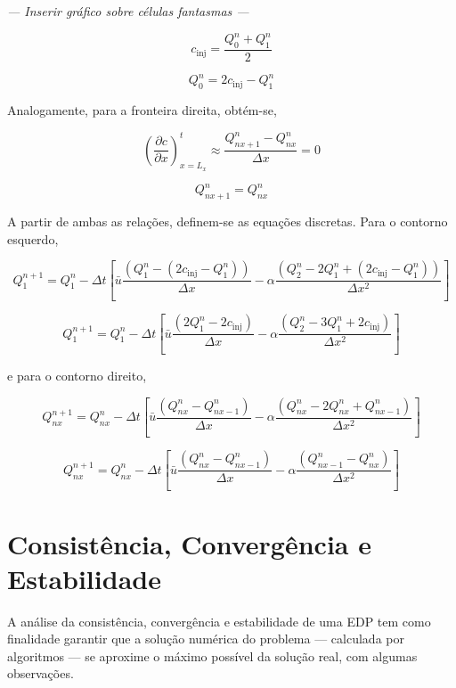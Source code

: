 \begin{center}
    \textit{--- Inserir gráfico sobre células fantasmas ---}
\end{center}

\[
    c_{\text{inj}} = \frac{Q_0^n + Q_1^n}{2}
\]

\begin{equation}\label{cont. esq}
    Q_0^n = 2c_{\text{inj}} - Q_1^n
\end{equation}

Analogamente, para a fronteira direita, obtém-se,

\[
  \left(\frac{\partial c}{\partial x}\right)_{x=L_x}^t
  \approx
  \frac{Q_{nx+1}^n - Q_{nx}^n}{\Delta x} = 0
\]

\begin{equation}\label{cont. dir}
    Q_{nx+1}^n = Q_{nx}^n
\end{equation}

A partir de ambas as relações, definem-se as equações discretas. Para o contorno
esquerdo,

\[
    Q_1^{n+1} = Q_1^n - \Delta t
    \left[
    \bar{u}\frac{(Q_1^n - (2c_{\text{inj}} - Q_1^n))}{\Delta x}
    -
    \alpha\frac{(Q_2^n - 2Q_1^n + (2c_{\text{inj}} - Q_1^n))}{\Delta x^2}
    \right]
\]

\begin{equation}
    Q_1^{n+1} = Q_1^n - \Delta t
    \left[
    \bar{u}\frac{(2Q_1^n - 2c_{\text{inj}})}{\Delta x}
    -
    \alpha\frac{(Q_2^n - 3Q_1^n + 2c_{\text{inj}})}{\Delta x^2}
    \right]
\end{equation}

\noindent e para o contorno direito,

\[
    Q_{nx}^{n+1} = Q_{nx}^n - \Delta t
    \left[
    \bar{u}\frac{(Q_{nx}^n - Q_{nx-1}^n)}{\Delta x}
    -
    \alpha\frac{(Q_{nx}^n - 2Q_{nx}^n + Q_{nx-1}^n)}{\Delta x^2}
    \right]
\]

\begin{equation}
    Q_{nx}^{n+1} = Q_{nx}^n - \Delta t
    \left[
    \bar{u}\frac{(Q_{nx}^n - Q_{nx-1}^n)}{\Delta x}
    -
    \alpha\frac{(Q_{nx-1}^n - Q_{nx}^n)}{\Delta x^2}
    \right]
\end{equation}

\section{Consistência, Convergência e Estabilidade}
A análise da consistência, convergência e estabilidade de uma EDP tem como
finalidade garantir que a solução numérica do problema --- calculada por
algoritmos --- se aproxime o máximo possível da solução real, com algumas
observações.


